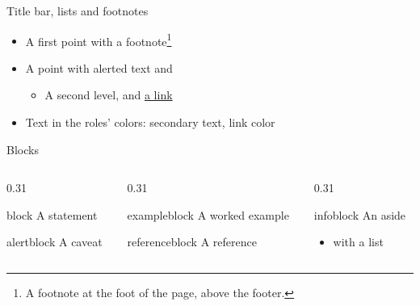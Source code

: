 \documentclass[aspectratio=169]{beamer}
\begin{document}

\begin{standardframe}{Title bar, lists and footnotes}
	\begin{itemize}
		\item A first point with a footnote\footnote{A footnote at the foot of the page, above the footer.}
		\item A point with \alert{alerted text} and 
		\begin{itemize}
			\item A second level, and \href{https://ctan.org/pkg/beamer}{a link}
		\end{itemize}
		\item Text in the roles' colors: \textcolor{c_text_muted}{secondary text}, \textcolor{c_link}{link color}
	\end{itemize}
\end{standardframe}

\begin{standardframe}{Blocks}
	\begin{columns}[t,onlytextwidth]
		\begin{column}{0.31\linewidth}
			\begin{block}{block}
				A statement
			\end{block}
			\begin{alertblock}{alertblock}
				A caveat
			\end{alertblock}
		\end{column}
		\begin{column}{0.31\linewidth}
			\begin{exampleblock}{exampleblock}
				A worked example
			\end{exampleblock}
			\begin{referenceblock}{referenceblock}
				A reference
			\end{referenceblock}
		\end{column}
		\begin{column}{0.31\linewidth}
			\begin{infoblock}{infoblock}
				An aside
				\begin{itemize}
					\item with a list
				\end{itemize}
			\end{infoblock}
		\end{column}
	\end{columns}
\end{standardframe}
\end{document}
